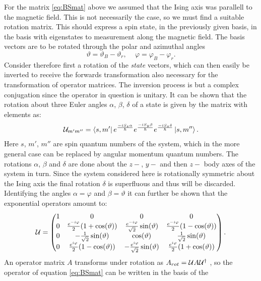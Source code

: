 \documentclass[a4paper]{article}
\newcommand{\U}{\ensuremath{\mathbb{\cal U}}}
\begin{document}
For the matrix \ref{eq:BSmat} above we assumed that the Ising axis was parallell to the magnetic field.
This is not necessarily the case, so we must find a suitable rotation matrix. This should
express a spin
state, in the previously given basis, in the basis with eigenstates to measurement along the
magnetic field. The basis vectors are to be rotated through the polar and azimuthal angles
\[
\vartheta = \vartheta_B - \vartheta_r \text{, }\quad \varphi = \varphi_B - \varphi_r
.\] 
Consider therefore first a rotation of the \textit{state} vectors, which can then easily
be inverted to receive the forwards transformation also necessary for the transformation
of operator matrices. The inversion process is but a complex
conjugation since the operator in question is unitary. It can be shown %
that the rotation about three Euler angles \(\alpha\), \(\beta\), \(\delta\) of a state is
given  by the matrix with elements as:
\begin{align*}
        \U_{m'm''} = \bra{s,
        m'}e^{\frac{-iS_z\alpha}{\hbar}}e^{\frac{-iS_y\beta}{\hbar}}e^{\frac{-iS_z\delta}{\hbar{}}}\ket{s,
m''}
.\end{align*}
Here \(s\), \(m'\), \(m''\) are spin quantum numbers of the system, which in the more general
case can be replaced by angular momentum quantum numbers. The rotations \(\alpha\),
\(\beta\) and \(\delta\) are done about the \(z-\), \(y-\) and then \(z-\) body axes of
the system in turn. Since the system considered here is rotationally symmetric about the
Ising axis the final rotation \(\delta\) is superfluous and thus will be discarded.
Identifying the angles \(\alpha = \varphi\) and \(\beta = \vartheta\) it can further be
shown that the exponential operators amount to:
\begin{align*}
        \U = \pmqty{
        1 & 0 & 0 & 0\\
        0 & \frac{e^{-i\varphi}}{2}(1+\cos(\vartheta)) &
        \frac{e^{-i\varphi}}{\sqrt{2}}\sin(\vartheta) &
        \frac{e^{-i\varphi}}{2}(1-\cos(\vartheta))\\
        0 & -\frac{1}{\sqrt{2}}\sin(\vartheta) & \cos(\vartheta) & \frac{1}{\sqrt{2} }
        \sin(\vartheta)\\
        0 & \frac{e^{i\varphi}}{2}(1-\cos(\vartheta)) &
        -\frac{e^{i\varphi}}{\sqrt{2}}\sin(\vartheta) & \frac{e^{i\varphi}}{2}(1 +
        \cos(\vartheta))
}
.\end{align*}
An operator matrix \(A\) transforms under rotation as \(A_{rot} = \U A\U^{\dagger}\)
, so the operator of equation \ref{eq:BSmat} can be written in the basis of the
\end{document}
